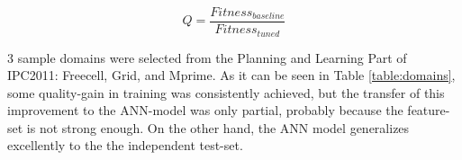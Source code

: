 \documentclass{sig-alt-release2}
\begin{document}
\begin{equation}Q=\frac{Fitness_{baseline}}{Fitness_{tuned}}\end{equation}

3 sample domains were selected from the Planning and Learning Part of IPC2011: Freecell, Grid, and Mprime. As it can be seen in Table \ref{table:domains}, some quality-gain in training was consistently achieved, but the transfer of this improvement to the ANN-model was only partial, probably because the feature-set is not strong enough. On the other hand, the ANN model generalizes excellently to the the independent test-set. 



\end{document}
